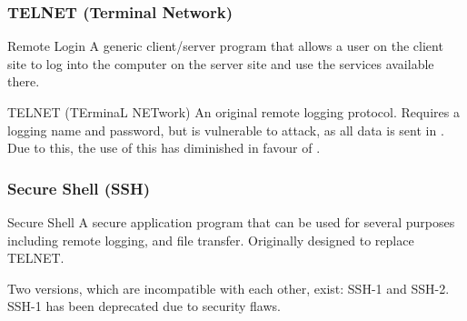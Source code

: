 \documentclass[\main/notes.tex]{subfiles}
\begin{document}
				\subsubsection{TELNET (Terminal Network)}
					\begin{definition}{Remote Login}
						A generic client/server program that allows a user on the client site to log into the computer on the server site and use the services available there.
					\end{definition}
					\begin{definition}{TELNET (TErminaL NETwork)}
						An original remote logging protocol. Requires a logging name and password, but is vulnerable to attack, as all data is sent in . Due to this, the use of this has diminished in favour of .
					\end{definition}
				\subsubsection{Secure Shell (SSH)}
					\begin{definition}{Secure Shell}
						A secure application program that can be used for several purposes including remote logging, and file transfer. Originally designed to replace TELNET.

						Two versions, which are incompatible with each other, exist: SSH-1 and SSH-2. SSH-1 has been deprecated due to security flaws.
					\end{definition}
\end{document}
